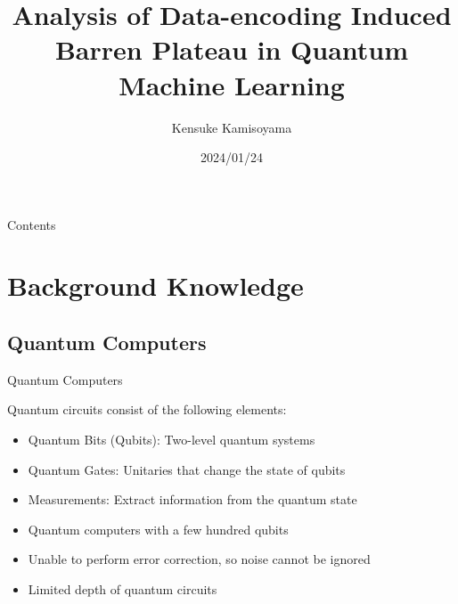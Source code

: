 \documentclass[dvipdfmx,10pt,aspectratio=169]{beamer}
\title{Analysis of Data-encoding Induced Barren Plateau in Quantum Machine Learning}
\author{Kensuke Kamisoyama}
\date{2024/01/24}
\begin{document}
\frame{\titlepage}

\begin{frame}{Contents}
    \tableofcontents
\end{frame}



\section{Background Knowledge}

\subsection{Quantum Computers}
\begin{frame}{Quantum Computers}
    \begin{center}
        {\large\colorbox{blue!40}{}}
    \end{center}
    \begin{center}
        \begin{minipage}{0.9\textwidth}
            Quantum circuits consist of the following elements:
            \begin{itemize}
                \item Quantum Bits (Qubits): Two-level quantum systems
                \item Quantum Gates: Unitaries that change the state of qubits
                \item Measurements: Extract information from the quantum state
            \end{itemize}
        \end{minipage}
    \end{center}

    \begin{center}
        {\large\colorbox{blue!40}{}}
    \end{center}

    \begin{center}
        \begin{minipage}{0.8\textwidth}
            \begin{itemize}
                \item Quantum computers with a few hundred qubits
                \item Unable to perform error correction, so noise cannot be ignored
                \item Limited depth of quantum circuits
            \end{itemize}
        \end{minipage}
    \end{center}
\end{frame}
\end{document}
